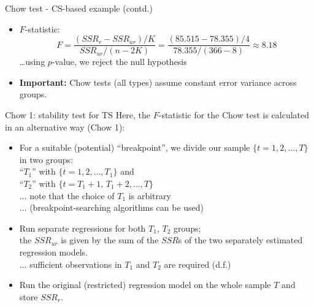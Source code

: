 \documentclass{beamer}
\begin{document}
\begin{frame}{Chow test - CS-based example (contd.)}
\begin{itemize}
\item $F$-statistic:
$$F= \frac{(\textit{SSR}_r - \textit{SSR}_{\textit{ur}})/K}{\textit{SSR}_{\textit{ur}}/(n-2K)}=\frac{(85.515 - 78.355)/4}{78.355/(366-8)}\approx8.18$$
\dots using $p$-value, we reject the null hypothesis \\
\vspace{3cm}
\item \textbf{Important:} Chow tests (all types) assume constant error variance across groups.
\end{itemize}
\end{frame}
\begin{frame}{Chow 1: stability test for TS}
Here, the $F$-statistic for the Chow test is calculated in an alternative way (Chow 1):
\begin{itemize}
\item For a suitable (potential) ``breakpoint'', we divide our sample $\{t=1,2, \dots, T\}$ in two groups: \\
``$T_1$'' with $\{t=1,2, \dots, T_1\}$ and \\
``$T_2$'' with $\{t=T_1 \!+\!1, \, T_1 \!+\!2, \dots, T\}$ \\
$\dots$ note that the choice of $T_1$ is arbitrary \\
$\dots$ (breakpoint-searching algorithms can be used)
\item Run separate regressions for both $T_1$, $T_2$ groups;  \\
the $\textit{SSR}_{\textit{ur}}$ is given by the sum of the $\textit{SSR}$s of the two separately estimated regression models. \\
$\dots$ sufficient observations in $T_1$ and $T_2$ are required (d.f.) 
\item Run the original (restricted) regression model on the whole sample $T$ and store $\textit{SSR}_r$.
\end{itemize}

\end{frame}
\end{document}
